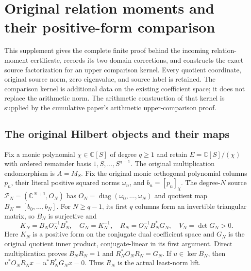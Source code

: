 \begingroup
\def\Tr{\operatorname{Tr}}
\def\im{\operatorname{im}}
\def\HS{\mathrm{HS}}
\def\rk{\operatorname{rank}}
\section{Original relation moments and their positive-form comparison}


This supplement gives the complete finite proof behind the incoming relation-moment
certificate, records its two domain corrections, and constructs the exact source
factorization for an upper comparison kernel. Every quotient coordinate, original
source norm, zero eigenvalue, and source label is retained. The comparison kernel
is additional data on the existing coefficient space; it does not replace the
arithmetic norm. The arithmetic construction of that kernel is supplied by the
cumulative paper's arithmetic upper-comparison proof.

\subsection{The original Hilbert objects and their maps}
Fix a monic polynomial $\chi\in\mathbb C[S]$ of degree $q\ge1$ and retain
$E=\mathbb C[S]/(\chi)$ with ordered remainder basis $1,S,\ldots,S^{q-1}$.
The original multiplication endomorphism is $A=M_S$. Fix the original monic
orthogonal polynomial columns $p_n$, their literal positive squared norms
$\omega_n$, and $b_n=[p_n]_\chi$. The degree-$N$ source
$\mathcal P_N=(\mathbb C^{N+1},O_N)$ has
$O_N=\operatorname{diag}(\omega_0,\ldots,\omega_N)$ and quotient map
$B_N=[b_0,\ldots,b_N]$. For $N\ge q-1$, its first $q$ columns form an
invertible triangular matrix, so $B_N$ is surjective and
\begin{equation}
 K_N=B_NO_N^{-1}B_N^*,\quad G_N=K_N^{-1},\quad
 R_N=O_N^{-1}B_N^*G_N,\quad V_N=\det G_N>0.\tag{RM.1}
\end{equation}
Here $K_N$ is a positive form on the conjugate dual coefficient space and
$G_N$ is the original quotient inner product, conjugate-linear in its first
argument. Direct multiplication proves $B_NR_N=1$ and
$R_N^*O_NR_N=G_N$. If $u\in\ker B_N$, then
$u^*O_NR_Nx=u^*B_N^*G_Nx=0$. Thus $R_N$ is the actual least-norm lift.

